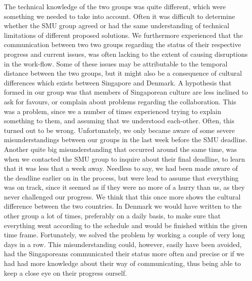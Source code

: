 The technical knowledge of the two groups was quite different, which were something we needed to take into account. Often it was difficult to determine whether the SMU group agreed or had the same understanding of technical limitations of different proposed solutions. We furthermore experienced that the communication between two two groups regarding the status of their respective progress and current issues, was often lacking to the extent of causing disruptions in the work-flow.  Some of these issues may be attributable to the temporal distance between the two groups, but it might also be a consequence of cultural differences which exists between Singapore and Denmark. A hypothesis that formed in our group was that members of Singaporean culture are less inclined to ask for favours, or complain about problems regarding the collaboration. This was a problem, since we a number of times experienced trying to explain something to them, and assuming that we understood each-other. Often, this turned out to be wrong. Unfortunately, we only became aware of some severe misunderstandings between our groups in the last week before the SMU deadline. Another quite big misunderstanding that occurred around the same time, was when we contacted the SMU group to inquire about their final deadline, to learn that it was less that a week away. Needless to say, we had been made aware of the deadline earlier on in the process, but were lead to assume that everything was on track, since it seemed as if they were no more of a hurry than us, as they never challenged our progress. We think that this once more shows the cultural difference between the two countries. In Denmark we would have written to the other group a lot of times, preferably on a daily basis, to make sure that everything went according to the schedule and would be finished within the given time frame. Fortunately, we solved the problem by working a couple of very long days in a row. This misunderstanding could, however, easily have been avoided, had the Singaporeans communicated their status more often and precise or if we had had more knowledge about their way of communicating, thus being able to keep a close eye on their progress ourself. 
